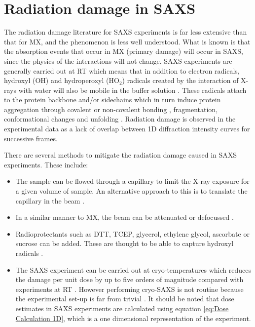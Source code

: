 \section{Radiation damage in SAXS}
\label{sec:Radiation damage in SAXS}
    The radiation damage literature for SAXS experiments is far less extensive than that for MX, and the phenomenon is less well understood.
    What is known is that the absorption events that occur in MX (primary damage) will occur in SAXS, since the physics of the interactions will not change.
    SAXS experiments are generally carried out at RT which means that in addition to electron radicals, hydroxyl (OH) and hydroperoxyl (HO$_{\text{2}}$) radicals created by the interaction of X-rays with water will also be mobile in the buffer solution \cite{jeffries2015limiting,garrison1987reaction}.
    These radicals attach to the protein backbone and/or sidechains which in turn induce protein aggregation through covalent or non-covalent bonding \cite{kuwamoto2004radiation}, fragmentation, conformational changes and unfolding \cite{hopkins2016quantifying}.
    Radiation damage is observed in the experimental data as a lack of overlap between 1D diffraction intensity curves for successive frames.

    There are several methods to mitigate the radiation damage caused in SAXS experiments. These include:
    \begin{itemize}
        \item The sample can be flowed through a capillary to limit the X-ray exposure for a given volume of sample.
        An alternative approach to this is to translate the capillary in the beam \cite{jeffries2015limiting}.
        \item In a similar manner to MX, the beam can be attenuated or defocussed \cite{jeffries2015limiting}.
        \item Radioprotectants such as DTT, TCEP, glycerol, ethylene glycol, ascorbate or sucrose can be added.
        These are thought to be able to capture hydroxyl radicals \cite{grishaev2012sample}.
        \item The SAXS experiment can be carried out at cryo-temperatures which reduces the damage per unit dose by up to five orders of magnitude compared with experiments at RT \cite{meisburger2013breaking}.
        However performing cryo-SAXS is not routine because the experimental set-up is far from trivial \cite{jeffries2015limiting}.
        It should be noted that dose estimates in SAXS experiments are calculated using equation \ref{eq:Dose Calculation 1D}, which is a one dimensional representation of the experiment.
    \end{itemize}


